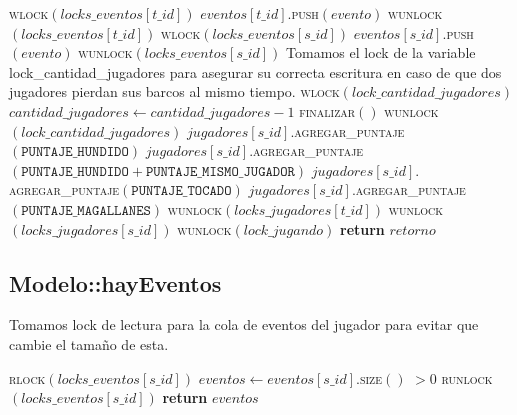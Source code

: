\documentclass[a4paper,10pt,twoside]{article}
\newenvironment{pseudo}[1][]{%
    \vspace{0.5em}%
    \begin{algorithmic}%
}
{%
    \end{algorithmic}%
    \vspace{0.5em}%
}
\newcommand{\Fn}[2]{\textsc{#1}$(#2)$}
\newcommand{\PReturn}[1]{\textbf{return} $#1$}
\begin{document}
\begin{pseudo}
                \State
                \State \Fn{wlock}{locks\_eventos[t\_id]} 
                \State $eventos[t\_id].$\Fn{push}{evento}
                \State \Fn{wunlock}{locks\_eventos[t\_id]}
                \State
                \State \Fn{wlock}{locks\_eventos[s\_id]} 
                \State $eventos[s\_id].$\Fn{push}{evento}
                \State \Fn{wunlock}{locks\_eventos[s\_id]}
                \State
                    \State 
                    \State Tomamos el lock de la variable lock\_cantidad\_jugadores para asegurar su correcta escritura en caso de que dos jugadores pierdan sus barcos al mismo tiempo.
                    \State 
                    \State \Fn{wlock}{lock\_cantidad\_jugadores}
                    \State $cantidad\_jugadores \leftarrow cantidad\_jugadores - 1$
                        \State \Fn{finalizar}{}
                    \EndIf
                    \State \Fn{wunlock}{lock\_cantidad\_jugadores}
                \EndIf
            \EndIf
                \State $jugadores[s\_id].$\Fn{agregar\_puntaje}{\texttt{PUNTAJE\_HUNDIDO}}
                \State $jugadores[s\_id].$\Fn{agregar\_puntaje}{\texttt{PUNTAJE\_HUNDIDO} + \texttt{PUNTAJE\_MISMO\_JUGADOR}}
                \State $jugadores[s\_id].$\Fn{agregar\_puntaje}{\texttt{PUNTAJE\_TOCADO}}
                \State $jugadores[s\_id].$\Fn{agregar\_puntaje}{\texttt{PUNTAJE\_MAGALLANES}}
            \EndIf
            \State
            \State \Fn{wunlock}{locks\_jugadores[t\_id]}
            \State \Fn{wunlock}{locks\_jugadores[s\_id]}
        \EndIf
        \State
        \State \Fn{wunlock}{lock\_jugando}
        \State
        \State \PReturn{retorno}
    \EndProcedure
\end{pseudo}


\subsection{Modelo::hayEventos}

Tomamos lock de lectura para la cola de eventos del jugador para evitar que cambie el tamaño de esta.

\begin{pseudo}
        \State \Fn{rlock}{locks\_eventos[s\_id]}
        \State $eventos \leftarrow eventos[s\_id]$.\Fn{size}{} $> 0$
        \State \Fn{runlock}{locks\_eventos[s\_id]}
        \State \PReturn{eventos}
    \EndProcedure
\end{pseudo}
\end{document}
